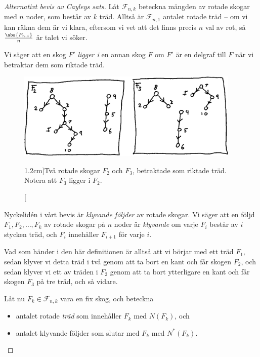 \documentclass[nobib]{tufte-handout}
\begin{document}
\begin{proof}[Alternativt bevis av Cayleys sats]
    Låt $\mathcal{F}_{n,k}$ beteckna mängden av rotade skogar med $n$ noder, som består av $k$ träd. Alltså är $\mathcal{F}_{n,1}$ antalet rotade träd -- om vi kan räkna dem är vi klara, eftersom vi vet att det finns precis $n$ val av rot, så $\frac{\abs{F_{n,1}}}{n}$ är talet vi söker.

    Vi säger att en skog $F'$ \emph{ligger i} en annan skog $F$ om $F'$ är en delgraf till $F$ när vi betraktar dem som riktade träd.

    \begin{figure}
        \centering
        \includegraphics[width=0.95\textwidth]{graphics/rooted_forest_subforest.png}
        \caption[][1.2cm]{Två rotade skogar $F_2$ och $F_3$, betraktade som riktade träd. Notera att $F_3$ ligger i $F_2$.}
        \label{fig:two_rooted_forests}
    \end{figure}

    Nyckelidén i vårt bevis är \emph{klyvande följder} av rotade skogar. Vi säger att en följd $F_1, F_2,\ldots, F_k$ av rotade skogar på $n$ noder är \emph{klyvande} om varje $F_i$ består av $i$ stycken träd, och $F_{i}$ innehåller $F_{i+1}$ för varje $i$.

    Vad som händer i den här definitionen är alltså att vi börjar med ett träd $F_1$, sedan klyver vi detta träd i två genom att ta bort en kant och får skogen $F_2$, och sedan klyver vi ett av träden i $F_2$ genom att ta bort ytterligare en kant och får skogen $F_3$ på tre träd, och så vidare.

    Låt nu $F_k \in \mathcal{F}_{n,k}$ vara en fix skog, och beteckna
    \begin{itemize}
        \item antalet rotade \emph{träd} som innehåller $F_k$ med $N(F_k)$, och
        \item antalet klyvande följder som slutar med $F_k$ med $N^*(F_k)$.
    \end{itemize}


\end{proof}
\end{document}
